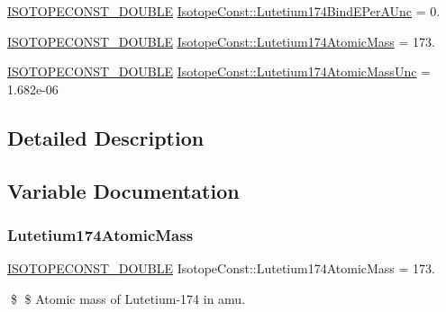 \begin{DoxyCompactItemize}
\mbox{\hyperlink{group___isotope_const-_macros_ga8f45a7272ce02c0b4c65c44636ed719a}{I\+S\+O\+T\+O\+P\+E\+C\+O\+N\+S\+T\+\_\+\+D\+O\+U\+B\+LE}} \mbox{\hyperlink{group___isotope_const-_lutetium-_lu174_ga8e13ad33f34d38745529c7d496bad4f6}{Isotope\+Const\+::\+Lutetium174\+Bind\+E\+Per\+A\+Unc}} = 0.
\item 
\mbox{\hyperlink{group___isotope_const-_macros_ga8f45a7272ce02c0b4c65c44636ed719a}{I\+S\+O\+T\+O\+P\+E\+C\+O\+N\+S\+T\+\_\+\+D\+O\+U\+B\+LE}} \mbox{\hyperlink{group___isotope_const-_lutetium-_lu174_ga86a63c4db652719ef4c3336184f71b5b}{Isotope\+Const\+::\+Lutetium174\+Atomic\+Mass}} = 173.
\item 
\mbox{\hyperlink{group___isotope_const-_macros_ga8f45a7272ce02c0b4c65c44636ed719a}{I\+S\+O\+T\+O\+P\+E\+C\+O\+N\+S\+T\+\_\+\+D\+O\+U\+B\+LE}} \mbox{\hyperlink{group___isotope_const-_lutetium-_lu174_ga2991f57fbe85f6afef6dae039b5dfccd}{Isotope\+Const\+::\+Lutetium174\+Atomic\+Mass\+Unc}} = 1.\+682e-\/06
\end{DoxyCompactItemize}


\subsection{Detailed Description}


\subsection{Variable Documentation}
\mbox{\label{group___isotope_const-_lutetium-_lu174_ga86a63c4db652719ef4c3336184f71b5b}} 
\subsubsection{\texorpdfstring{Lutetium174\+Atomic\+Mass}{Lutetium174AtomicMass}}
{\footnotesize\ttfamily \mbox{\hyperlink{group___isotope_const-_macros_ga8f45a7272ce02c0b4c65c44636ed719a}{I\+S\+O\+T\+O\+P\+E\+C\+O\+N\+S\+T\+\_\+\+D\+O\+U\+B\+LE}} Isotope\+Const\+::\+Lutetium174\+Atomic\+Mass = 173.}

\$ \$ Atomic mass of Lutetium-\/174 in amu. \mbox{\label{group___isotope_const-_lutetium-_lu174_ga2991f57fbe85f6afef6dae039b5dfccd}} 
